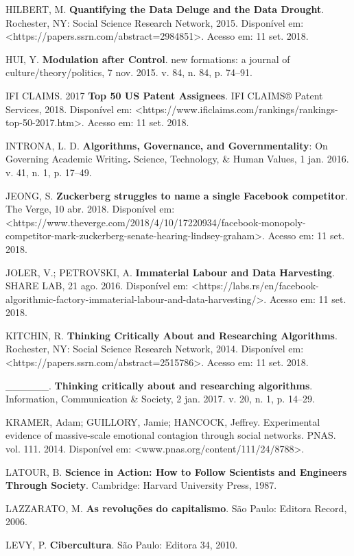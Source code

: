 HILBERT, M. \textbf{Quantifying the Data Deluge and the Data Drought}.
Rochester, NY: Social Science Research Network, 2015. Disponível em:
\textless{}https://papers.ssrn.com/abstract=2984851\textgreater{}.
Acesso em: 11 set. 2018.

HUI, Y. \textbf{Modulation after Control}. new formations: a journal of
culture/theory/politics, 7 nov. 2015. v. 84, n. 84, p. 74--91.

IFI CLAIMS. 2017 \textbf{Top 50 US Patent Assignees}. IFI CLAIMS® Patent
Services, 2018. Disponível em:
\textless{}https://www.ificlaims.com/rankings/rankings-top-50-2017.htm\textgreater{}.
Acesso em: 11 set. 2018.

INTRONA, L. D. \textbf{Algorithms, Governance, and Governmentality}: On
Governing Academic Writing\textbf{.} Science, Technology, \& Human
Values, 1 jan. 2016. v. 41, n. 1, p. 17--49.

JEONG, S. \textbf{Zuckerberg struggles to name a single Facebook
competitor}. The Verge, 10 abr. 2018. Disponível em:
\textless{}https://www.theverge.com/2018/4/10/17220934/facebook-monopoly-competitor-mark-zuckerberg-senate-hearing-lindsey-graham\textgreater{}.
Acesso em: 11 set. 2018.

JOLER, V.; PETROVSKI, A. \textbf{Immaterial Labour and Data Harvesting}.
SHARE LAB, 21 ago. 2016. Disponível em:
\textless{}https://labs.rs/en/facebook-algorithmic-factory-immaterial-labour-and-data-harvesting/\textgreater{}.
Acesso em: 11 set. 2018.

KITCHIN, R. \textbf{Thinking Critically About and Researching
Algorithms}. Rochester, NY: Social Science Research Network, 2014.
Disponível em:
\textless{}https://papers.ssrn.com/abstract=2515786\textgreater{}.
Acesso em: 11 set. 2018.

\_\_\_\_\_\_. \textbf{Thinking critically about and researching
algorithms}. Information, Communication \& Society, 2 jan. 2017. v. 20,
n. 1, p. 14--29.

KRAMER, Adam; GUILLORY, Jamie; HANCOCK, Jeffrey. Experimental evidence
of massive-scale emotional contagion through social networks. PNAS. vol.
111. 2014. Disponível em:
\textless{}www.pnas.org/content/111/24/8788\textgreater{}.

LATOUR, B. \textbf{Science in Action: How to Follow Scientists and
Engineers Through Society}. Cambridge: Harvard University Press, 1987.

LAZZARATO, M. \textbf{As revoluções do capitalismo}. São Paulo: Editora
Record, 2006.

LEVY, P. \textbf{Cibercultura}. São Paulo: Editora 34, 2010.

